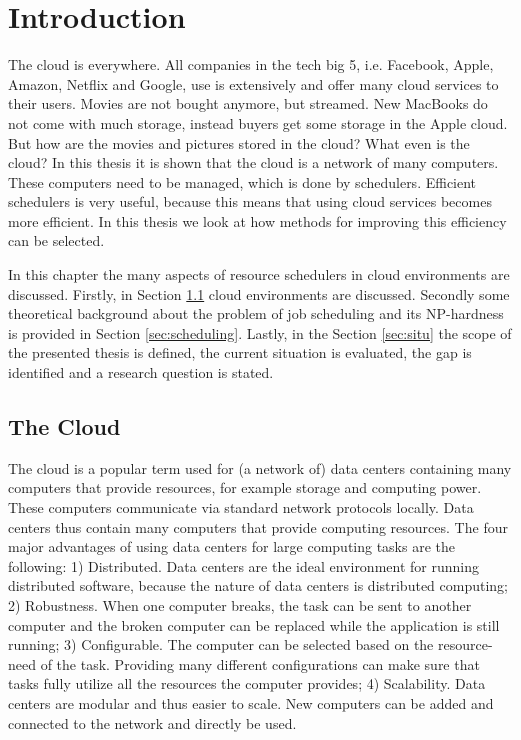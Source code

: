 \chapter{Introduction}

The cloud is everywhere. All companies in the tech big 5, i.e. Facebook,
Apple, Amazon, Netflix and Google, use is extensively and offer many cloud
services to their users. Movies are not bought anymore, but streamed. New
MacBooks do not come with much storage, instead buyers get some storage in the
Apple cloud. But how are the movies and pictures stored in the cloud? What
even is the cloud? In this thesis it is shown that the cloud is a network of
many computers. These computers need to be managed, which is done by
schedulers. Efficient schedulers is very useful, because this means that using
cloud services becomes more efficient. In this thesis we look at how methods
for improving this efficiency can be selected.

In this chapter the many aspects of resource schedulers in cloud environments
are discussed. Firstly, in Section \ref{sec:cloud} cloud environments are
discussed. Secondly some theoretical background about the problem of job
scheduling and its NP-hardness is provided in Section \ref{sec:scheduling}.
Lastly, in the Section \ref{sec:situ} the scope of the presented thesis is
defined, the current situation is evaluated, the gap is identified and a
research question is stated.

\section{The Cloud}\label{sec:cloud}

The cloud is a popular term used for (a network of) data centers containing
many computers that provide resources, for example storage and computing
power. These computers communicate via standard network protocols locally.
Data centers thus contain many computers that provide computing resources. The
four major advantages of using data centers for large computing tasks are the
following: 1) Distributed. Data centers are the ideal environment for running
distributed software, because the nature of data centers is distributed
computing; 2) Robustness. When one computer breaks, the task can be sent to
another computer and the broken computer can be replaced while the application
is still running; 3) Configurable. The computer can be selected based on the
resource-need of the task. Providing many different configurations can make
sure that tasks fully utilize all the resources the computer provides; 4)
Scalability. Data centers are modular and thus easier to scale. New computers
can be added and connected to the network and directly be used.

